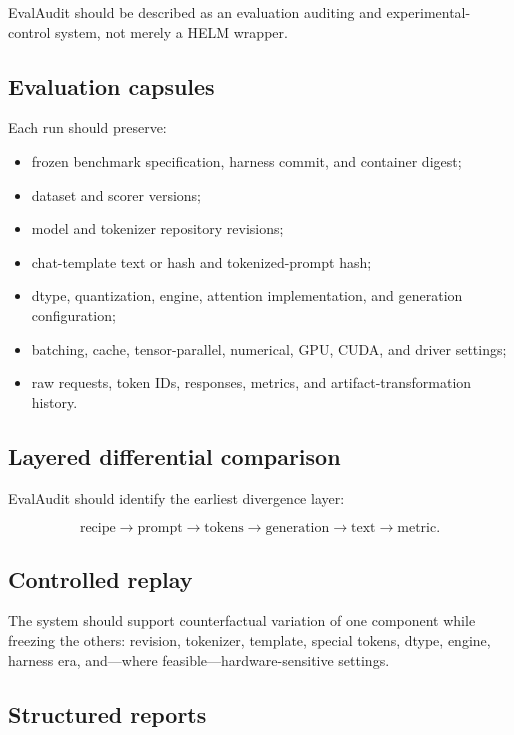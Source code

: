 \documentclass[11pt]{article}
\begin{document}
EvalAudit should be described as an evaluation auditing and experimental-control system, not merely a HELM wrapper.

\subsection{Evaluation capsules}

Each run should preserve:

\begin{itemize}
  \item frozen benchmark specification, harness commit, and container digest;
  \item dataset and scorer versions;
  \item model and tokenizer repository revisions;
  \item chat-template text or hash and tokenized-prompt hash;
  \item dtype, quantization, engine, attention implementation, and generation configuration;
  \item batching, cache, tensor-parallel, numerical, GPU, CUDA, and driver settings;
  \item raw requests, token IDs, responses, metrics, and artifact-transformation history.
\end{itemize}

\subsection{Layered differential comparison}

EvalAudit should identify the earliest divergence layer:

\[
\text{recipe} \rightarrow \text{prompt} \rightarrow \text{tokens} \rightarrow
\text{generation} \rightarrow \text{text} \rightarrow \text{metric}.
\]

\subsection{Controlled replay}

The system should support counterfactual variation of one component while freezing the others: revision, tokenizer, template, special tokens, dtype, engine, harness era, and---where feasible---hardware-sensitive settings.

\subsection{Structured reports}
\end{document}
